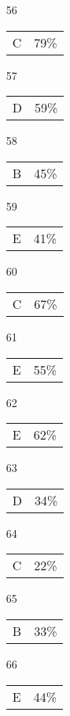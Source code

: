 \documentclass{article}
\begin{document}
\begin{multicols}{4}
\begin{enumerate}
       \item[]
    
    \item[56] \begin{tabular}{cc} C & 79\%\end{tabular}
    
    \item[57] \begin{tabular}{cc} D & 59\%\end{tabular}
    
    \item[58] \begin{tabular}{cc} B & 45\%\end{tabular}
    
    \item[59] \begin{tabular}{cc} E & 41\%\end{tabular}
    
    \item[60] \begin{tabular}{cc} C & 67\%\end{tabular}
    
       \item[]
    
    \item[61] \begin{tabular}{cc} E & 55\%\end{tabular}
    
    \item[62] \begin{tabular}{cc} E & 62\%\end{tabular}
    
    \item[63] \begin{tabular}{cc} D & 34\%\end{tabular}
    
    \item[64] \begin{tabular}{cc} C & 22\%\end{tabular}
    
    \item[65] \begin{tabular}{cc} B & 33\%\end{tabular}
    
       \item[]
    
    \item[66] \begin{tabular}{cc} E & 44\%\end{tabular}
    

\end{enumerate}
\end{multicols}
\end{document}
